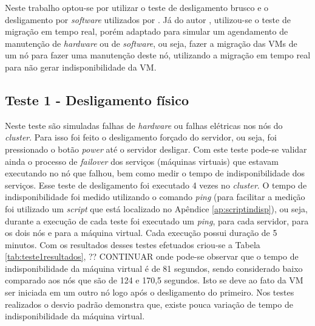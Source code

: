 Neste trabalho optou-se por utilizar o teste de desligamento brusco e o desligamento por \textit{software} utilizados por \citet{reis2009}.
Já do autor \citet{goncalves2009}, utilizou-se o teste de migração em tempo real, porém adaptado para simular um agendamento de manutenção de 
\textit{hardware} ou de \textit{software}, ou seja, fazer a migração das \acp{VM} de um nó para fazer uma manutenção deste nó, utilizando a
migração em tempo real para não gerar indisponibilidade da \ac{VM}.


\subsection{Teste 1 - Desligamento físico}

Neste teste são simuladas falhas de \textit{hardware} ou falhas elétricas nos nós do \textit{cluster}. Para isso foi feito o desligamento 
forçado do servidor, ou seja, foi pressionado o botão \textit{power} até o servidor desligar.
Com este teste pode-se validar ainda o processo de \textit{failover} dos serviços (máquinas virtuais) que estavam executando no nó que falhou, 
bem como medir o tempo de indisponibilidade dos serviços. 
Esse teste de desligamento foi executado 4 vezes no \textit{cluster}. O tempo de indisponibilidade foi medido utilizando o comando \textit{ping}
(para facilitar a medição foi utilizado um \textit{script} que está localizado no Apêndice \ref{ap:scriptindisp}), ou seja, durante a execução de 
cada teste foi executado um \textit{ping}, para cada servidor, para os dois nós e para a máquina virtual. Cada execução possui duração de 5 minutos.
Com os resultados desses testes efetuados criou-se a Tabela \ref{tab:teste1resultados}, ?? CONTINUAR onde pode-se observar que o tempo de indisponibilidade 
da máquina virtual é de 81 segundos, sendo considerado baixo comparado aos nós que são de 124 e 170,5 segundos. Isto se deve ao fato da \ac{VM} 
ser iniciada em um outro nó logo após o desligamento do primeiro. Nos testes realizados o desvio padrão demonstra que, existe pouca variação de 
tempo de indisponibilidade da máquina virtual.

